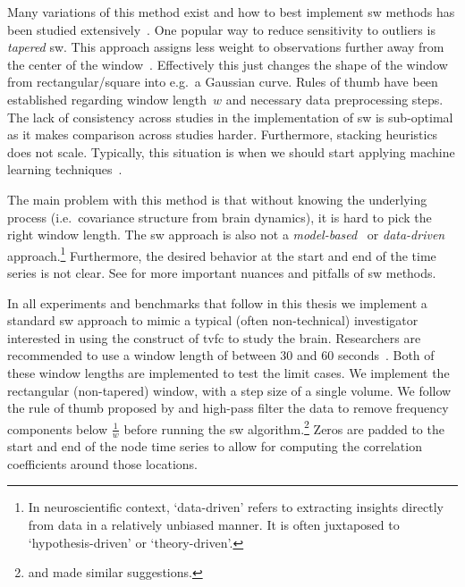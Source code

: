 Many variations of this method exist and how to best implement \gls{sw} methods has been studied extensively~\parencite[see e.g.][]{Mokhtari2019, Vergara2019}.
One popular way to reduce sensitivity to outliers is \emph{tapered} \gls{sw}.
This approach assigns less weight to observations further away from the center of the window~\parencite{Allen2014, Lindquist2014}.
Effectively this just changes the shape of the window from rectangular/square into e.g.~a Gaussian curve.
%
Rules of thumb have been established regarding window length~$w$ and necessary data preprocessing steps.
%
The lack of consistency across studies in the implementation of \gls{sw} is sub-optimal as it makes comparison across studies harder.
Furthermore, stacking heuristics does not scale.
Typically, this situation is when we should start applying machine learning techniques~\parencite[][built this case beautifully]{Zinkevich2015}.

The main problem with this method is that without knowing the underlying process (i.e.~covariance structure from brain dynamics), it is hard to pick the right window length.
%
The \gls{sw} approach is also not a \emph{model-based}~\parencite{Foti2019} or \emph{data-driven} approach.\footnote{In neuroscientific context, `data-driven' refers to extracting insights directly from data in a relatively unbiased manner. It is often juxtaposed to `hypothesis-driven' or `theory-driven'.}
Furthermore, the desired behavior at the start and end of the time series is not clear.
See \textcite{Lindquist2014, Leonardi2015, Hindriks2016} for more important nuances and pitfalls of \gls{sw} methods.

In all experiments and benchmarks that follow in this thesis we implement a standard \gls{sw} approach to mimic a typical (often non-technical) investigator interested in using the construct of \gls{tvfc} to study the brain.
Researchers are recommended to use a window length of between 30 and 60 seconds~\parencite{Shirer2012}.
Both of these window lengths are implemented to test the limit cases.
We implement the rectangular (non-tapered) window, with a step size of a single volume.
We follow the rule of thumb proposed by \textcite{Leonardi2015} and high-pass filter the data to remove frequency components below $\frac{1}{w}$ before running the \gls{sw} algorithm.\footnote{\textcite{Smith2012} and \textcite{Hutchison2013} made similar suggestions.}
Zeros are padded to the start and end of the node time series to allow for computing the correlation coefficients around those locations.

